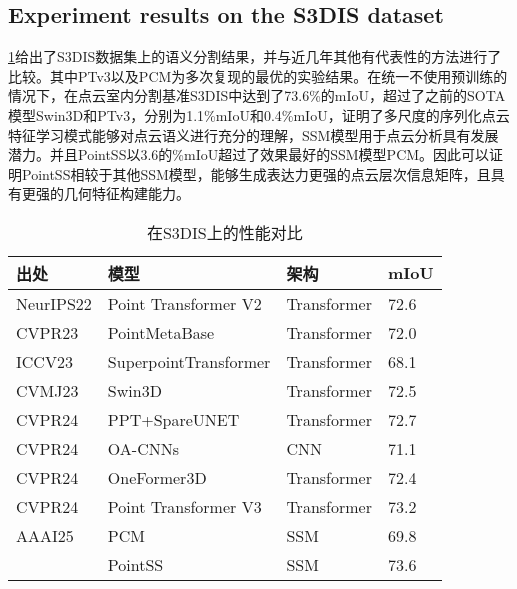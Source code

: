 \documentclass[preprint,12pt]{elsarticle}
\begin{document}
\subsection{Experiment results on the S3DIS dataset}
\cref{tab:s3dis}给出了S3DIS数据集上的语义分割结果，并与近几年其他有代表性的方法进行了比较。其中PTv3以及PCM为多次复现的最优的实验结果。在统一不使用预训练的情况下，在点云室内分割基准S3DIS中达到了73.6\%的mIoU，超过了之前的SOTA模型Swin3D和PTv3，分别为1.1\%mIoU和0.4\%mIoU，证明了多尺度的序列化点云特征学习模式能够对点云语义进行充分的理解，SSM模型用于点云分析具有发展潜力。并且PointSS以3.6的\%mIoU超过了效果最好的SSM模型PCM。因此可以证明PointSS相较于其他SSM模型，能够生成表达力更强的点云层次信息矩阵，且具有更强的几何特征构建能力。
\begin{table}[htbp!]
	\caption{在S3DIS上的性能对比}
\label{tab:s3dis}
	\begin{tabular}{@{}llll@{}}
		\toprule
		\textbf{出处}  & \textbf{模型}           & \textbf{架构} & \textbf{mIoU} \\ \midrule
		NeurIPS22 & Point Transformer V2\cite{ptv2}  & Transformer & 72.6          \\
		CVPR23     & PointMetaBase\cite{pmb}         & Transformer & 72.0          \\
		ICCV23     & SuperpointTransformer\cite{spt} & Transformer & 68.1          \\
		CVMJ23     & Swin3D\cite{Swin3D}                & Transformer & 72.5          \\
		CVPR24     & PPT+SpareUNET\cite{ppt}         & Transformer & 72.7          \\
		CVPR24     & OA-CNNs\cite{oacnn}               & CNN         & 71.1          \\
		CVPR24     & OneFormer3D\cite{OneFormer3D}           & Transformer & 72.4          \\
		CVPR24     & Point Transformer V3\cite{ptv3}           & Transformer & 73.2          \\
		AAAI25    & PCM\cite{pcm}                   & SSM         & 69.8         \\
		& PointSS               &SSM           & 73.6          \\ \bottomrule
	\end{tabular}
		\centering
	

\end{table}
\end{document}
